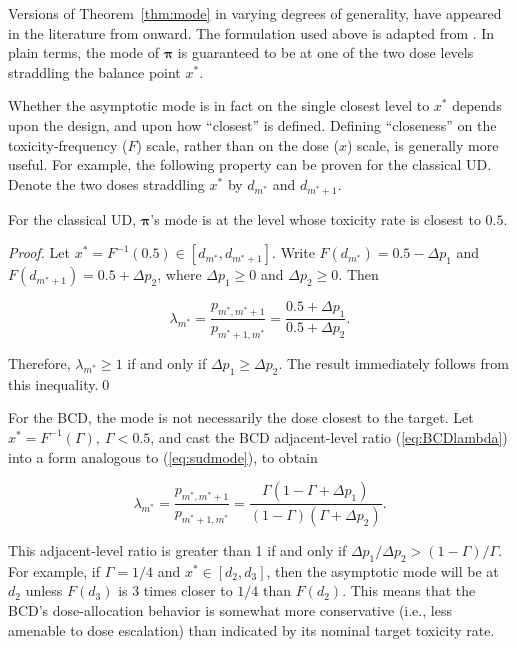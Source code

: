 Versions of Theorem~\ref{thm:mode} in varying degrees of generality, have appeared in the literature from \cite{Derm:Nonp:1957} onward. The formulation used above is adapted from \cite{Oron:Hoff:thek:2009}. In plain terms, the mode of $\boldsymbol{\pi}$ is guaranteed to be at one of the two dose levels straddling the balance point $x^*$.

Whether the asymptotic mode is in fact on the single closest level to $x^*$ depends upon the design, and upon how ``closest'' is defined. Defining ``closeness'' on the toxicity-frequency ($F$) scale, rather than on the dose ($x$) scale, is generally more useful. For example, the following property can be proven for the classical UD. Denote the two doses straddling $x^*$ by $d_{m^*}$ and $d_{m^*+1}$.

\begin{thm}\label{thm:modesud}
For the classical UD, $\boldsymbol{\pi}$'s mode is at the level whose toxicity rate is closest to $0.5$.
\end{thm}

\begin{proof} Let $x^*=F^{-1}(0.5)\in [d_{m^*},d_{m^*+1}]$. Write $F\left(d_{m^*}\right)=0.5-\Delta p_1$ and $F\left(d_{m^*+1}\right)=0.5+\Delta p_2$, where $\Delta p_1\geq 0$ and $\Delta p_2\geq 0$. Then

\begin{equation}\label{eq:sudmode}
\lambda_{m^*}=\frac{p_{m^*,m^*+1}}{p_{m^*+1,m^*}}=\frac{0.5+\Delta p_1}{0.5+\Delta p_2}.
\end{equation}

\noindent Therefore, $\lambda_{m^*}\geq 1$ if and only if $\Delta p_1\geq\Delta p_2$. The result immediately follows from this inequality.\qed
\end{proof}

For the BCD, the mode is not necessarily the dose closest to the target. Let $x^*=F^{-1}(\Gamma),\ \Gamma<0.5$, and cast the BCD adjacent-level ratio (\ref{eq:BCDlambda}) into a form analogous to (\ref{eq:sudmode}), to obtain

\begin{equation*}
\lambda_{m^*}=\frac{p_{m^*,m^*+1}}{p_{m^*+1,m^*}}=\frac{\Gamma\left(1-\Gamma+\Delta p_1\right)}{(1-\Gamma)\left(\Gamma+\Delta p_2\right)}.
\end{equation*}

\noindent This adjacent-level ratio is greater than 1 if and only if $\Delta p_1/\Delta p_2>(1-\Gamma)/\Gamma$. For example, if $\Gamma=1/4$ and $x^*\in\left[d_2,d_3\right]$, then the asymptotic mode will be at $d_2$ unless $F\left(d_3\right)$ is 3 times closer to $1/4$ than $F\left(d_2\right)$. This means that the BCD's dose-allocation behavior is somewhat more conservative (i.e., less amenable to dose escalation) than indicated by its nominal target toxicity rate.

